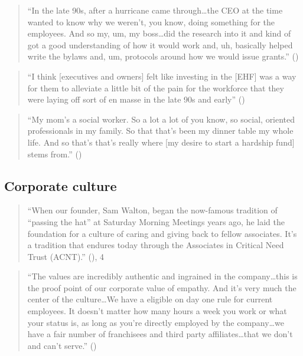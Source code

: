 \documentclass[
  11pt,
  oneside]{article}
\begin{document}
\begin{quote}
``In the late 90s, after a hurricane came through\ldots the CEO at the time wanted to know why we weren't, you know, doing something for the employees. And so my, um, my boss\ldots did the research into it and kind of got a good understanding of how it would work and, uh, basically helped write the bylaws and, um, protocols around how we would issue grants.'' ()
\end{quote}

\begin{quote}
``I think {[}executives and owners{]} felt like investing in the {[}EHF{]} was a way for them to alleviate a little bit of the pain for the workforce that they were laying off sort of en masse in the late 90s and early'' ()
\end{quote}

\begin{quote}
``My mom's a social worker. So a lot a lot of you know, so social, oriented professionals in my family. So that that's been my dinner table my whole life. And so that's that's really where {[}my desire to start a hardship fund{]} stems from.'' ()
\end{quote}

\subsection{Corporate culture}\label{corporate-culture}

\begin{quote}
``When our founder, Sam Walton, began the now-famous tradition of ``passing the hat'' at Saturday Morning Meetings years ago, he laid the foundation for a culture of caring and giving back to fellow associates. It's a tradition that endures today through the Associates in Critical Need Trust (ACNT).'' (), 4
\end{quote}

\begin{quote}
``The values are incredibly authentic and ingrained in the company\ldots this is the proof point of our
corporate value of empathy. And it's very much the center of the culture\ldots We have a eligible on day one rule for current employees. It doesn't matter how many hours a week you work or what your status is, as long as you're directly employed by the company\ldots we have a fair number of franchisees and third party affiliates\ldots that we don't and can't serve.'' ()
\end{quote}
\end{document}
